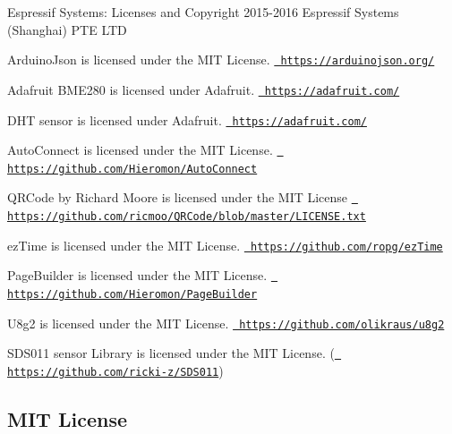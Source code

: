 \begin{DoxyItemize}
\item Espressif Systems\+: Licenses and Copyright 2015-\/2016 Espressif Systems (Shanghai) P\+TE L\+TD
\item Arduino\+Json is licensed under the M\+IT License. \href{https://arduinojson.org/}{\texttt{ https\+://arduinojson.\+org/}}
\item Adafruit B\+M\+E280 is licensed under Adafruit. \href{https://adafruit.com/}{\texttt{ https\+://adafruit.\+com/}}
\item D\+HT sensor is licensed under Adafruit. \href{https://adafruit.com/}{\texttt{ https\+://adafruit.\+com/}}
\item Auto\+Connect is licensed under the M\+IT License. \href{https://github.com/Hieromon/AutoConnect}{\texttt{ https\+://github.\+com/\+Hieromon/\+Auto\+Connect}}
\item Q\+R\+Code by Richard Moore is licensed under the M\+IT License \href{https://github.com/ricmoo/QRCode/blob/master/LICENSE.txt}{\texttt{ https\+://github.\+com/ricmoo/\+Q\+R\+Code/blob/master/\+L\+I\+C\+E\+N\+S\+E.\+txt}}
\item ez\+Time is licensed under the M\+IT License. \href{https://github.com/ropg/ezTime}{\texttt{ https\+://github.\+com/ropg/ez\+Time}}
\item Page\+Builder is licensed under the M\+IT License. \href{https://github.com/Hieromon/PageBuilder}{\texttt{ https\+://github.\+com/\+Hieromon/\+Page\+Builder}}
\item U8g2 is licensed under the M\+IT License. \href{https://github.com/olikraus/u8g2}{\texttt{ https\+://github.\+com/olikraus/u8g2}}
\item S\+D\+S011 sensor Library is licensed under the M\+IT License. (\href{https://github.com/ricki-z/SDS011}{\texttt{ https\+://github.\+com/ricki-\/z/\+S\+D\+S011}})
\end{DoxyItemize}\hypertarget{index_mit}{}\subsection{M\+I\+T License}\label{index_mit}
